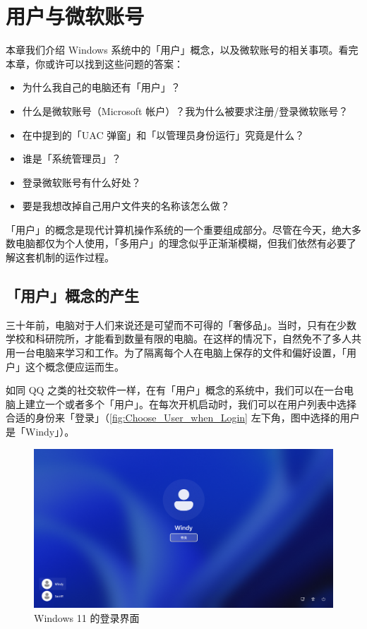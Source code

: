 \chapter{用户与微软账号}
\label{cha:user-and-ms-account}

\begin{intro}
  本章我们介绍 Windows 系统中的「用户」概念，以及微软账号的相关事项。看完本章，你或许可以找到这些问题的答案：

  \begin{itemize}
    \item 为什么我自己的电脑还有「用户」？
    \item 什么是微软账号（Microsoft 帐户\footnotemark）？我为什么被要求注册/登录微软账号？
    \item 在中提到的「UAC 弹窗」和「以管理员身份运行」究竟是什么？
    \item 谁是「系统管理员」？
    \item 登录微软账号有什么好处？
    \item 要是我想改掉自己用户文件夹的名称该怎么做？
  \end{itemize}
\end{intro}

「用户」的概念是现代计算机操作系统的一个重要组成部分。尽管在今天，绝大多数电脑都仅为个人使用，「多用户」的理念似乎正渐渐模糊，但我们依然有必要了解这套机制的运作过程。

\section{「用户」概念的产生}

三十年前，电脑对于人们来说还是可望而不可得的「奢侈品」。当时，只有在少数学校和科研院所，才能看到数量有限的电脑。在这样的情况下，自然免不了多人共用一台电脑来学习和工作。为了隔离每个人在电脑上保存的文件和偏好设置，「用户」这个概念便应运而生。

如同 QQ 之类的社交软件一样，在有「用户」概念的系统中，我们可以在一台电脑上建立一个或者多个「用户」。在每次开机启动时，我们可以在用户列表中选择合适的身份来「登录」（\autoref{fig:Choose_User_when_Login} 左下角，图中选择的用户是「Windy」）。

\begin{figure}[htb!]
  \centering
  \includegraphics[width=.7\textwidth]{assets/advanced/Choose_User_when_Login.png}
  \caption{Windows 11 的登录界面}
  \label{fig:Choose_User_when_Login}
\end{figure}

